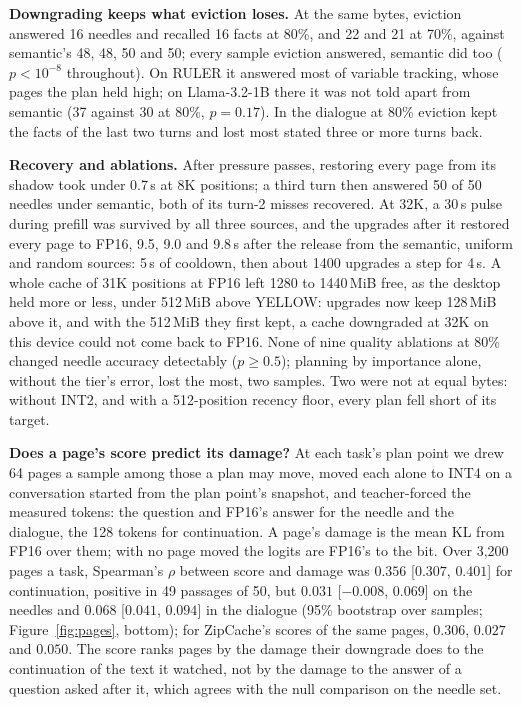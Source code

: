 \documentclass{article}
\begin{document}
\textbf{Downgrading keeps what eviction loses.} At the same bytes, eviction
answered 16 needles and recalled 16 facts at 80\%, and 22 and 21 at 70\%,
against semantic's 48, 48, 50 and 50; every sample eviction answered, semantic
did too ($p < 10^{-8}$ throughout). On RULER it answered most of
variable tracking, whose pages the plan held high; on Llama-3.2-1B there it was
not told apart from semantic (37 against 30 at 80\%, $p = 0.17$). In the dialogue at 80\% eviction kept the
facts of the last two turns and lost most stated three or more turns back.

\textbf{Recovery and ablations.} After pressure passes, restoring every page
from its shadow took under 0.7\,s at 8K positions; a third turn then answered
50 of 50 needles under semantic, both of its turn-2 misses recovered. At 32K,
a 30\,s pulse during prefill was survived by all three sources, and the upgrades
after it restored every page to FP16, 9.5, 9.0 and 9.8\,s after the release from
the semantic, uniform and random sources: 5\,s of cooldown, then about 1400
upgrades a step for 4\,s. A whole cache of 31K positions at FP16 left 1280 to
1440\,MiB free, as the
desktop held more or less, under 512\,MiB above YELLOW: upgrades now keep
128\,MiB above it, and with the 512\,MiB they first kept, a cache downgraded at
32K on this device could not come back to FP16.
None of nine quality ablations at 80\% changed needle accuracy detectably
($p \ge 0.5$); planning by importance alone, without the tier's error, lost
the most, two samples. Two were not at equal bytes: without INT2, and with a
512-position recency floor, every plan fell short of its target.

\textbf{Does a page's score predict its damage?} At each task's plan point
we drew 64 pages a sample among those a plan may move, moved each alone to
INT4 on a conversation started from the plan point's snapshot, and
teacher-forced the measured tokens: the question and FP16's answer for the
needle and the dialogue, the 128 tokens for continuation. A page's damage is
the mean KL from FP16 over them; with no page moved the logits are FP16's to the
bit. Over 3{,}200 pages a task, Spearman's $\rho$ between score and damage was
$0.356$ [$0.307$, $0.401$] for continuation, positive in 49 passages of 50, but
$0.031$ [$-0.008$, $0.069$] on the needles and $0.068$ [$0.041$, $0.094$] in the
dialogue (95\% bootstrap over samples; Figure~\ref{fig:pages}, bottom); for ZipCache's
scores of the same pages,
$0.306$, $0.027$ and $0.050$. The score ranks pages by the damage
their downgrade does to the continuation of the text it watched, not by the
damage to the answer of a question asked after it, which agrees with the null
comparison on the needle set.
\end{document}
